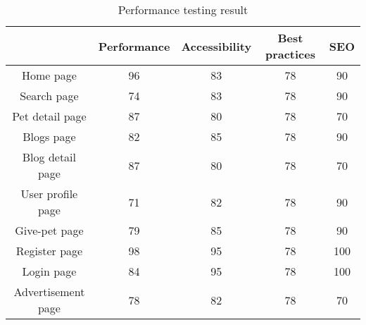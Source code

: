 \begin{table}[H]
  \caption{Performance testing result}
  \label{Performance testing result}
  \centering
  {
    \renewcommand{\arraystretch}{1.5}
      \begin{tabular}{|c|c|c|c|c|}
      \hline
                          & \textbf{Performance}       & \textbf{Accessibility}     & \textbf{Best practices}    & \textbf{SEO}                                       \\ \hline
      Home page          & \cellcolor[HTML]{32CB00}96 & \cellcolor[HTML]{FFFC9E}83 & \cellcolor[HTML]{FFFC9E}78 & \cellcolor[HTML]{32CB00}90                         \\ \hline
      Search page        & \cellcolor[HTML]{FFFC9E}74 & \cellcolor[HTML]{FFFC9E}83 & \cellcolor[HTML]{FFFC9E}78 & \cellcolor[HTML]{32CB00}90                         \\ \hline
      Pet detail page    & \cellcolor[HTML]{FFFC9E}87 & \cellcolor[HTML]{FFFC9E}80 & \cellcolor[HTML]{FFFC9E}78 & \cellcolor[HTML]{FFFC9E}70                         \\ \hline
      Blogs page         & \cellcolor[HTML]{FFFC9E}82 & \cellcolor[HTML]{FFFC9E}85 & \cellcolor[HTML]{FFFC9E}78 & \cellcolor[HTML]{32CB00}90                         \\ \hline
      Blog detail page   & \cellcolor[HTML]{FFFC9E}87 & \cellcolor[HTML]{FFFC9E}80 & \cellcolor[HTML]{FFFC9E}78 & \cellcolor[HTML]{FFFC9E}70                         \\ \hline
      User profile page  & \cellcolor[HTML]{FFFC9E}71 & \cellcolor[HTML]{FFFC9E}82 & \cellcolor[HTML]{FFFC9E}78 & \cellcolor[HTML]{32CB00}90                         \\ \hline
      Give-pet page      & \cellcolor[HTML]{FFFC9E}79 & \cellcolor[HTML]{FFFC9E}85 & \cellcolor[HTML]{FFFC9E}78 & \cellcolor[HTML]{32CB00}90                         \\ \hline
      Register page      & \cellcolor[HTML]{32CB00}98 & \cellcolor[HTML]{32CB00}95 & \cellcolor[HTML]{FFFC9E}78 & \cellcolor[HTML]{32CB00}100                        \\ \hline
      Login page         & \cellcolor[HTML]{FFFC9E}84 & \cellcolor[HTML]{32CB00}95 & \cellcolor[HTML]{FFFC9E}78 & \cellcolor[HTML]{32CB00}100                        \\ \hline
      Advertisement page & \cellcolor[HTML]{FFFC9E}78 & \cellcolor[HTML]{FFFC9E}82 & \cellcolor[HTML]{FFFC9E}78 & \cellcolor[HTML]{FFFC9E}70                         \\ \hline
      \end{tabular}
  }
  \end{table}